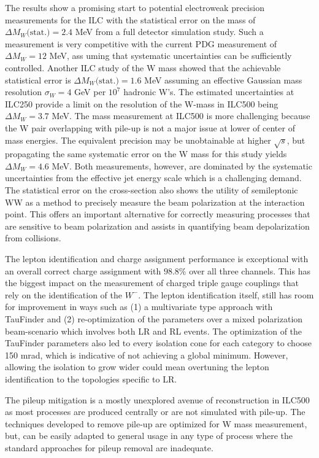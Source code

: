 The results show a promising start to potential electroweak precision measurements for the ILC with the statistical error on the mass of $\Delta M_W\text{(stat.)}= 2.4$ MeV from a full detector simulation study. Such a measurement is very competitive with the current PDG measurement of $\Delta M_W=12$ MeV, ass uming that systematic uncertainties can be sufficiently controlled.  Another ILC study of the W mass showed that the achievable statistical error is $\Delta M_W\text{(stat.)} = 1.6$ MeV assuming an effective Gaussian mass resolution $\sigma_W= 4$ GeV per $10^7$ hadronic W's\cite{graham}. The estimated uncertainties at ILC250 provide a limit on the resolution of the W-mass in ILC500 being $\Delta M_W =3.7$ MeV. The mass measurement at ILC500 is more challenging because the W pair overlapping with pile-up is not a major issue at lower of center of mass energies. The equivalent precision may be unobtainable at higher $\sqrt{s}$, but propagating the same systematic error on the W mass for this study yields $\Delta M_W = 4.6$ MeV. Both measurements, however, are dominated by the systematic uncertainties from the effective jet energy scale which is a challenging demand.  The statistical error on the cross-section also shows the utility of semileptonic WW as a method to precisely measure the beam polarization at the interaction point. This offers an important alternative for  correctly measuring processes that are sensitive to beam polarization and assists in quantifying beam depolarization from collisions.

The lepton identification and charge assignment performance is exceptional with an overall correct charge assignment with $98.8\%$ over all three channels. This has the biggest impact on the measurement of charged triple gauge couplings that rely on the identification of the $W^-$. The lepton identification itself, still has room for improvement in ways such as (1) a multivariate type approach with TauFinder and (2) re-optimization of the parameters over a mixed polarization beam-scenario which involves both LR and RL events.  The optimization of the TauFinder parameters also led to every isolation cone for each category to choose 150 mrad, which is indicative of not achieving a global minimum. However, allowing the isolation to grow wider could mean overtuning the lepton identification to the topologies specific to LR. 

The pileup mitigation is a mostly unexplored avenue of reconstruction in ILC500 as most processes are produced centrally or are not simulated with pile-up. The techniques developed to remove pile-up are optimized for W mass measurement, but, can be easily adapted to general usage in any type of process where the standard approaches for pileup removal are inadequate. 

